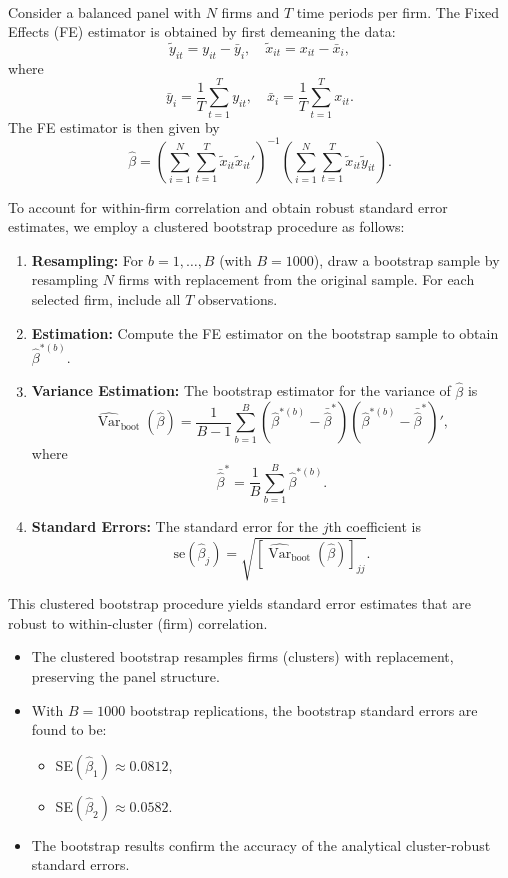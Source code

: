 \documentclass[a4paper,12pt]{article} %
\theoremstyle{nonitalic}
\newenvironment{solution}[1]
  {\renewcommand\theinnercustomsol{#1}\innercustomsol}
  {\endinnercustomsol}
\newcounter{solutionctr}
\renewcommand{\thesolutionctr}{(\alph{solutionctr})}
\newenvironment{autosolution}
  {\stepcounter{solutionctr}\begin{solution}{\thesolutionctr}}
  {\end{solution}}
\begin{document}
\begin{autosolution}
\

Consider a balanced panel with \(N\) firms and \(T\) time periods per firm. The Fixed Effects (FE) estimator is obtained by first demeaning the data:
\[
\tilde{y}_{it} = y_{it} - \bar{y}_i,\quad \tilde{x}_{it} = x_{it} - \bar{x}_i,
\]
where
\[
\bar{y}_i = \frac{1}{T}\sum_{t=1}^{T}y_{it}, \quad \bar{x}_i = \frac{1}{T}\sum_{t=1}^{T}x_{it}.
\]
The FE estimator is then given by
\[
\hat{\beta} = \left(\sum_{i=1}^{N}\sum_{t=1}^{T}\tilde{x}_{it}\tilde{x}_{it}'\right)^{-1}\left(\sum_{i=1}^{N}\sum_{t=1}^{T}\tilde{x}_{it}\tilde{y}_{it}\right).
\]

To account for within-firm correlation and obtain robust standard error estimates, we employ a clustered bootstrap procedure as follows:

\begin{enumerate}
    \item \textbf{Resampling:} For \(b=1,\dots,B\) (with \(B=1000\)), draw a bootstrap sample by resampling \(N\) firms with replacement from the original sample. For each selected firm, include all \(T\) observations.
    
    \item \textbf{Estimation:} Compute the FE estimator on the bootstrap sample to obtain \(\hat{\beta}^{*(b)}\).
    
    \item \textbf{Variance Estimation:} The bootstrap estimator for the variance of \(\hat{\beta}\) is
    \[
    \widehat{\operatorname{Var}}_{\text{boot}}(\hat{\beta}) = \frac{1}{B-1}\sum_{b=1}^{B}\left(\hat{\beta}^{*(b)} - \bar{\hat{\beta}}^{*}\right)\left(\hat{\beta}^{*(b)} - \bar{\hat{\beta}}^{*}\right)',
    \]
    where
    \[
    \bar{\hat{\beta}}^{*} = \frac{1}{B}\sum_{b=1}^{B}\hat{\beta}^{*(b)}.
    \]
    
    \item \textbf{Standard Errors:} The standard error for the \(j\)th coefficient is
    \[
    \text{se}(\hat{\beta}_{j}) = \sqrt{\left[\widehat{\operatorname{Var}}_{\text{boot}}(\hat{\beta})\right]_{jj}}.
    \]
\end{enumerate}

This clustered bootstrap procedure yields standard error estimates that are robust to within-cluster (firm) correlation.

\begin{itemize}
    
    \item The clustered bootstrap resamples firms (clusters) with replacement, preserving the panel structure.
    \item With \(B = 1000\) bootstrap replications, the bootstrap standard errors are found to be:
    \begin{itemize}
        \item SE\((\hat{\beta}_1) \approx 0.0812\),
        \item SE\((\hat{\beta}_2) \approx 0.0582\).
    \end{itemize}
    \item The bootstrap results confirm the accuracy of the analytical cluster-robust standard errors.
\end{itemize}


\end{autosolution}
\end{document}
